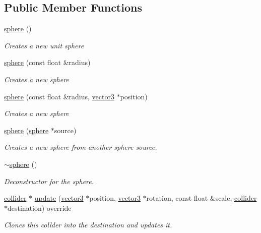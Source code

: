 \subsection*{Public Member Functions}
\begin{DoxyCompactItemize}
\item 
\hyperlink{classflounder_1_1sphere_a99e656a77996015079eb9744db5d7330}{sphere} ()
\begin{DoxyCompactList}\small\item\em Creates a new unit sphere \end{DoxyCompactList}\item 
\hyperlink{classflounder_1_1sphere_ad6598fc632cabc8a516cef89f1f0cae9}{sphere} (const float \&radius)
\begin{DoxyCompactList}\small\item\em Creates a new sphere \end{DoxyCompactList}\item 
\hyperlink{classflounder_1_1sphere_a760cbc4b1b1dc51e47813b4c0d0b489d}{sphere} (const float \&radius, \hyperlink{classflounder_1_1vector3}{vector3} $\ast$position)
\begin{DoxyCompactList}\small\item\em Creates a new sphere \end{DoxyCompactList}\item 
\hyperlink{classflounder_1_1sphere_a9457d57b8555428bd6abeb4bb6fd6dcb}{sphere} (\hyperlink{classflounder_1_1sphere}{sphere} $\ast$source)
\begin{DoxyCompactList}\small\item\em Creates a new sphere from another sphere source. \end{DoxyCompactList}\item 
\hyperlink{classflounder_1_1sphere_ab6f5bcdd6c9f36e582aab2e267b1abcf}{$\sim$sphere} ()
\begin{DoxyCompactList}\small\item\em Deconstructor for the sphere. \end{DoxyCompactList}\item 
\hyperlink{classflounder_1_1collider}{collider} $\ast$ \hyperlink{classflounder_1_1sphere_a7be08c96c7a4295eb6c2a4ee6c004266}{update} (\hyperlink{classflounder_1_1vector3}{vector3} $\ast$position, \hyperlink{classflounder_1_1vector3}{vector3} $\ast$rotation, const float \&scale, \hyperlink{classflounder_1_1collider}{collider} $\ast$destination) override
\begin{DoxyCompactList}\small\item\em Clones this collder into the destination and updates it. \end{DoxyCompactList}\item 

\end{DoxyCompactItemize}

